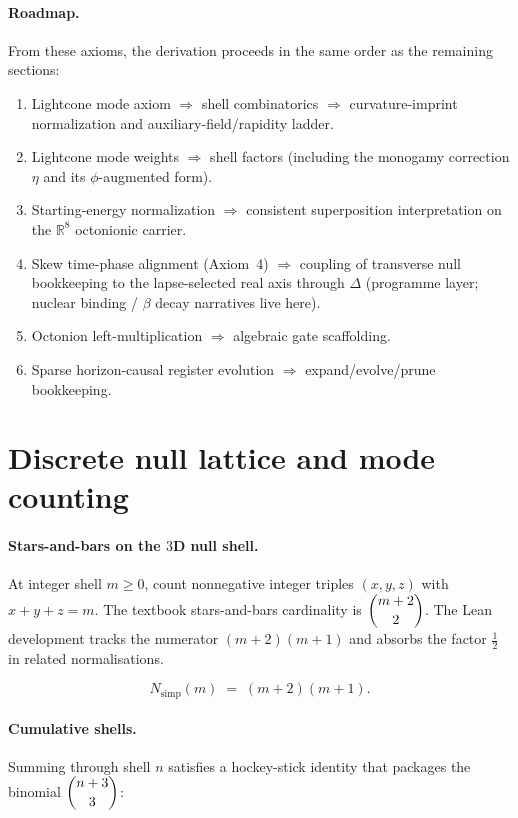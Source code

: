 \documentclass[11pt,a4paper]{article}
\theoremstyle{remark}
\begin{document}
\paragraph{Roadmap.}
From these axioms, the derivation proceeds in the same order as the remaining sections:
\begin{enumerate}
  \item Lightcone mode axiom $\Rightarrow$ shell combinatorics $\Rightarrow$ curvature-imprint normalization and auxiliary-field/rapidity ladder.
  \item Lightcone mode weights $\Rightarrow$ shell factors (including the monogamy correction $\eta$ and its $\phi$-augmented form).
  \item Starting-energy normalization $\Rightarrow$ consistent superposition interpretation on the $\mathbb{R}^8$ octonionic carrier.
  \item Skew time-phase alignment (Axiom~4) $\Rightarrow$ coupling of transverse null bookkeeping to the lapse-selected real axis through $\Delta$ (programme layer; nuclear binding / $\beta$ decay narratives live here).
  \item Octonion left-multiplication $\Rightarrow$ algebraic gate scaffolding.
  \item Sparse horizon-causal register evolution $\Rightarrow$ expand/evolve/prune bookkeeping.
\end{enumerate}

\section{Discrete null lattice and mode counting}

\paragraph{Stars-and-bars on the $3$D null shell.}
At integer shell $m\ge 0$, count nonnegative integer triples $(x,y,z)$ with $x+y+z=m$. The textbook stars-and-bars cardinality is $\dbinom{m+2}{2}$. The Lean development tracks the numerator $(m+2)(m+1)$ and absorbs the factor $\tfrac12$ in related normalisations.

\begin{equation}
  N_{\mathrm{simp}}(m) \;=\; (m+2)(m+1).
\end{equation}

\paragraph{Cumulative shells.}
Summing through shell $n$ satisfies a hockey-stick identity that packages the binomial $\dbinom{n+3}{3}$:
\end{document}
